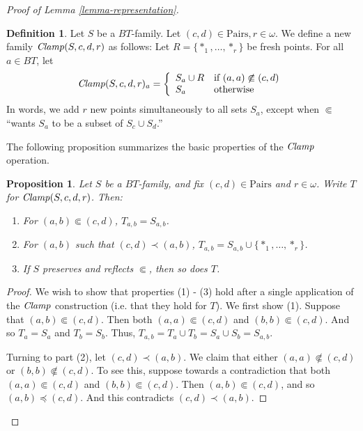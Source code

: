 \documentclass[letterpaper]{article}
\newtheorem{proposition}[theorem]{Proposition}
\theoremstyle{definition}
\newtheorem{definition}[theorem]{Definition}
\newcommand{\set}[1]{\{ #1 \}}
\newcommand{\Pairs}{\mbox{Pairs}}
\newcommand{\Clamp}{\protect{\mbox{\textit{Clamp}}}}
\newcommand{\precsubseteq}{\Subset}
\begin{document}
\begin{proof}[Proof of Lemma \ref{lemma-representation}]
\begin{definition}  Let $S$ be a $BT$-family.  Let $(c, d) \in \Pairs, r \in \omega$. 
We define a new family $\Clamp(S, c, d, r)$ as follows: 
Let $R = \set{*_1, \ldots, *_r}$ be fresh points.  For all $a \in BT$, let
\[ \begin{array}{lcl}
\Clamp(S,c,d,r)_a = \left\{
\begin{array}{ll}
S_a \cup R & \mbox{if $ (a,a) \not \precsubseteq (c,d)$}\\
 S_a & \mbox{otherwise}\\ 
 \end{array}
 \right.
\end{array}
\]
In words, we add $r$ new points
simultaneously to all sets $S_a$, except when 
$\precsubseteq$ ``wants 
$S_a$ to be a subset of  $S_c\cup S_d$.''

\end{definition}

The following proposition summarizes the basic properties
of the $\Clamp$ operation.  %
\begin{proposition}
Let $S$ be a $BT$-family, and fix $(c, d) \in \Pairs$ and $r \in \omega$.  Write $T$ for $\Clamp(S, c, d, r)$.  Then:

\begin{enumerate}
    \item For $(a,b)\precsubseteq (c,d)$, $T_{a,b} = S_{a,b}$. \label{part-easy}

    \item For $(a,b)$ such that $(c,d) \prec (a,b)$, $T_{a,b} =  S_{a,b}\cup\set{*_1,\ldots, *_r}$. \label{part-bigger}

    \item If $S$ preserves and reflects $\precsubseteq$, then so does $T$. \label{part-preserve}
\end{enumerate}

\label{proposition-sClamp}

\end{proposition}
\begin{proof}
We wish to show that properties (1) - (3) hold after a single application of the $\Clamp$ construction (i.e. that they hold for $T$).  We first show (1).  Suppose that $(a, b) \Subset (c, d)$.  Then both $(a,a) \Subset (c,d)$ and $(b,b) \Subset (c,d)$.  And so $T_a = S_a$ and $T_b = S_b$.  Thus, $T_{a,b} = T_a \cup T_b = S_a \cup S_b = S_{a,b}$.
 
Turning to part (2), let  $(c,d) \prec (a,b)$.
 We claim that either $(a,a) \not \precsubseteq (c,d)$ or $(b,b) \not \precsubseteq (c,d)$.
To see this, suppose towards a contradiction that both $(a,a) \precsubseteq(c,d)$ and $(b,b) \precsubseteq (c,d)$.
 Then $(a,b) \precsubseteq (c,d)$, and so $(a,b) \preceq (c,d)$.  And this contradicts 
$(c,d) \prec (a,b)$.


\end{proof}
\end{proof}
\end{document}
